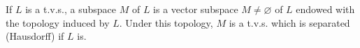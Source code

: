 If $L$ is a t.v.s., a subspace $M$ of $L$ is a vector subspace $M \neq \varnothing$ of $L$ endowed with the topology induced by $L$. Under this topology, $M$ is a t.v.s. which is separated (Hausdorff) if $L$ is.
